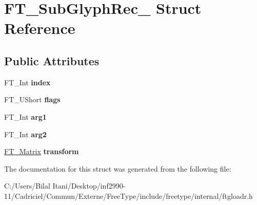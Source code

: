 \hypertarget{struct_f_t___sub_glyph_rec__}{}\section{F\+T\+\_\+\+Sub\+Glyph\+Rec\+\_\+ Struct Reference}
\label{struct_f_t___sub_glyph_rec__}
\subsection*{Public Attributes}
\begin{DoxyCompactItemize}
\item 
F\+T\+\_\+\+Int {\bfseries index}\hypertarget{struct_f_t___sub_glyph_rec___aa4febc2d867ff074ac116b068f372d3a}{}\label{struct_f_t___sub_glyph_rec___aa4febc2d867ff074ac116b068f372d3a}

\item 
F\+T\+\_\+\+U\+Short {\bfseries flags}\hypertarget{struct_f_t___sub_glyph_rec___a2d02aefc16061f7e039f76074518f6e5}{}\label{struct_f_t___sub_glyph_rec___a2d02aefc16061f7e039f76074518f6e5}

\item 
F\+T\+\_\+\+Int {\bfseries arg1}\hypertarget{struct_f_t___sub_glyph_rec___ad9f6b04ef50e1b39db90331e76f38206}{}\label{struct_f_t___sub_glyph_rec___ad9f6b04ef50e1b39db90331e76f38206}

\item 
F\+T\+\_\+\+Int {\bfseries arg2}\hypertarget{struct_f_t___sub_glyph_rec___a0d27a8b473379cedeb061f9ecd7e97da}{}\label{struct_f_t___sub_glyph_rec___a0d27a8b473379cedeb061f9ecd7e97da}

\item 
\hyperlink{struct_f_t___matrix__}{F\+T\+\_\+\+Matrix} {\bfseries transform}\hypertarget{struct_f_t___sub_glyph_rec___a3c5fc1959a357c6c2b970ec2118d2683}{}\label{struct_f_t___sub_glyph_rec___a3c5fc1959a357c6c2b970ec2118d2683}

\end{DoxyCompactItemize}


The documentation for this struct was generated from the following file\+:\begin{DoxyCompactItemize}
\item 
C\+:/\+Users/\+Bilal Itani/\+Desktop/inf2990-\/11/\+Cadriciel/\+Commun/\+Externe/\+Free\+Type/include/freetype/internal/ftgloadr.\+h\end{DoxyCompactItemize}
